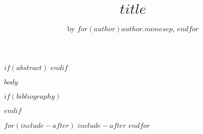 \documentclass[letterpaper,twocolumn]{article}
\title{$title$}
\author{by $for(author)$$author.name$$sep$, $endfor$}
\begin{document}
\maketitle
$if(abstract)$
$endif$

$body$

$if(bibliography)$

$endif$

$for(include-after)$
$include-after$
$endfor$
\end{document}
